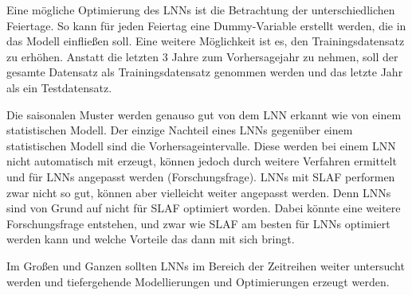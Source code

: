 \documentclass[11pt,ngerman,a4paper,]{article}
\begin{document}
Eine mögliche Optimierung des LNNs ist die Betrachtung der unterschiedlichen Feiertage. So kann für jeden Feiertag eine Dummy-Variable erstellt werden, die in das Modell einfließen soll. Eine weitere Möglichkeit ist es, den Trainingsdatensatz zu erhöhen. Anstatt die letzten 3 Jahre zum Vorhersagejahr zu nehmen, soll der gesamte Datensatz als Trainingsdatensatz genommen werden und das letzte Jahr als ein Testdatensatz.

Die saisonalen Muster werden genauso gut von dem LNN erkannt wie von einem statistischen Modell. Der einzige Nachteil eines LNNs gegenüber einem statistischen Modell sind die Vorhersageintervalle. Diese werden bei einem LNN nicht automatisch mit erzeugt, können jedoch durch weitere Verfahren ermittelt und für LNNs angepasst werden (Forschungsfrage). LNNs mit SLAF performen zwar nicht so gut, können aber vielleicht weiter angepasst werden. Denn LNNs sind von Grund auf nicht für SLAF optimiert worden. Dabei könnte eine weitere Forschungsfrage entstehen, und zwar wie SLAF am besten für LNNs optimiert werden kann und welche Vorteile das dann mit sich bringt.

Im Großen und Ganzen sollten LNNs im Bereich der Zeitreihen weiter untersucht werden und tiefergehende Modellierungen und Optimierungen erzeugt werden.

\newpage
\printbibliography
\end{document}

